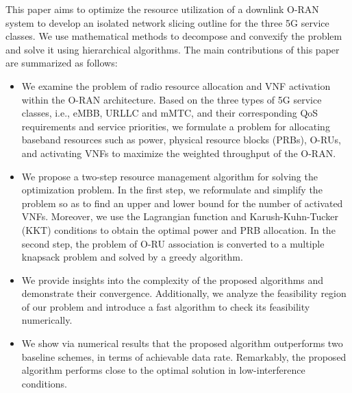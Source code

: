 \documentclass[12pt, letterpaper]{article}
\begin{document}
This paper aims to optimize the resource utilization of a downlink O-RAN system to develop an isolated network slicing outline for the three 5G service classes.
We use mathematical methods to decompose and convexify the problem and solve it using hierarchical algorithms.
 The main contributions of this paper are summarized as follows:
\begin{itemize}
\item We examine the problem of radio resource allocation and VNF activation within the O-RAN architecture.
Based on the three types of 5G service classes, i.e., eMBB, URLLC and mMTC, and their corresponding QoS requirements and service priorities, we formulate a problem for allocating baseband resources such as power, physical resource blocks (PRBs), O-RUs, and activating VNFs to maximize the weighted throughput of the O-RAN.
\item We propose a two-step resource management algorithm for solving the optimization problem.
In the first step, we reformulate and simplify the problem so as to find an upper and lower bound for the number of activated VNFs. Moreover, we use the Lagrangian function and Karush-Kuhn-Tucker (KKT) conditions to obtain the optimal power and PRB allocation. In the second step, the problem of O-RU association is converted to a multiple knapsack problem and solved by a greedy algorithm.
\item We provide insights into the complexity of the proposed algorithms and demonstrate their convergence. Additionally, we analyze the feasibility region of our problem and introduce a fast algorithm to check its feasibility numerically.
\item We show via numerical results that the proposed algorithm outperforms two baseline schemes, in terms of achievable data rate. Remarkably, the proposed algorithm performs close to the optimal solution in low-interference conditions.
\end{itemize}
\end{document}
